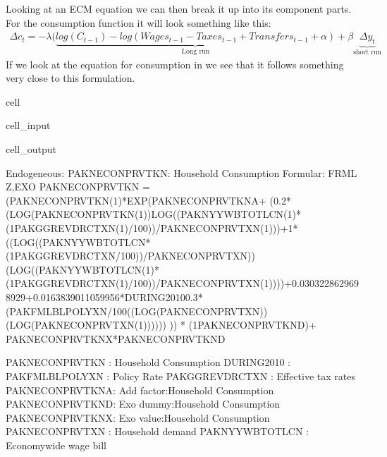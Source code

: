\documentclass[letterpaper,10pt,english]{jupyterBook}
\begin{document}
\sphinxAtStartPar
Looking at an ECM equation we can then break it up into its component parts.  For the consumption function it will look something like this:
\begin{equation*}
\begin{split} \Delta c_t = -\lambda (\underbrace{
        log(C_{t-1})-log(Wages_{t-1}-Taxes_{t-1}+Transfers_{t-1} + \alpha)}   _\text{Long run}
+\beta \underbrace{\Delta y_t}_\text{short run}\end{split}
\end{equation*}
\sphinxAtStartPar
If we look at the equation for consumption in  we see that it follows something very close to this formulation.

\begin{sphinxuseclass}{cell}\begin{sphinxVerbatimInput}

\begin{sphinxuseclass}{cell_input}
\begin{sphinxVerbatim}[commandchars=\\\{\}]
\end{sphinxVerbatim}

\end{sphinxuseclass}\end{sphinxVerbatimInput}
\begin{sphinxVerbatimOutput}

\begin{sphinxuseclass}{cell_output}
\begin{sphinxVerbatim}[commandchars=\\\{\}]
Endogeneous: PAKNECONPRVTKN: Household Consumption
Formular: FRML \PYGZlt{}Z,EXO\PYGZgt{} PAKNECONPRVTKN = (PAKNECONPRVTKN(\PYGZhy{}1)*EXP(\PYGZhy{}PAKNECONPRVTKN\PYGZus{}A+ (\PYGZhy{}0.2*(LOG(PAKNECONPRVTKN(\PYGZhy{}1))\PYGZhy{}LOG((PAKNYYWBTOTLCN(\PYGZhy{}1)*(1\PYGZhy{}PAKGGREVDRCTXN(\PYGZhy{}1)/100))/PAKNECONPRVTXN(\PYGZhy{}1)))+1*((LOG((PAKNYYWBTOTLCN*(1\PYGZhy{}PAKGGREVDRCTXN/100))/PAKNECONPRVTXN))\PYGZhy{}(LOG((PAKNYYWBTOTLCN(\PYGZhy{}1)*(1\PYGZhy{}PAKGGREVDRCTXN(\PYGZhy{}1)/100))/PAKNECONPRVTXN(\PYGZhy{}1))))+0.0303228629698929+0.0163839011059956*DURING\PYGZus{}2010\PYGZhy{}0.3*(PAKFMLBLPOLYXN/100\PYGZhy{}((LOG(PAKNECONPRVTXN))\PYGZhy{}(LOG(PAKNECONPRVTXN(\PYGZhy{}1)))))) )) * (1\PYGZhy{}PAKNECONPRVTKN\PYGZus{}D)+ PAKNECONPRVTKN\PYGZus{}X*PAKNECONPRVTKN\PYGZus{}D  \PYGZdl{}

PAKNECONPRVTKN  : Household Consumption
DURING\PYGZus{}2010     : 
PAKFMLBLPOLYXN  : Policy Rate
PAKGGREVDRCTXN  : Effective tax rates
PAKNECONPRVTKN\PYGZus{}A: Add factor:Household Consumption
PAKNECONPRVTKN\PYGZus{}D: Exo dummy:Household Consumption
PAKNECONPRVTKN\PYGZus{}X: Exo value:Household Consumption
PAKNECONPRVTXN  : Household demand
PAKNYYWBTOTLCN  : Economy\PYGZhy{}wide wage bill
\end{sphinxVerbatim}

\end{sphinxuseclass}\end{sphinxVerbatimOutput}

\end{sphinxuseclass}
\end{document}
